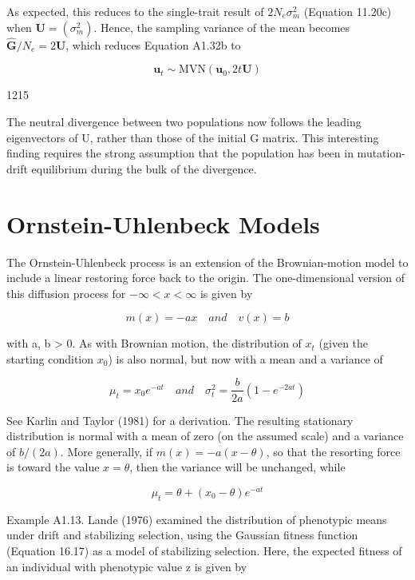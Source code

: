 \documentclass{article}
\begin{document}
As expected, this reduces to the single-trait result of  $ 2N_e\sigma_m^2 $ (Equation 11.20c) when  $ \mathbf{U} = (\sigma_m^2) $. Hence, the sampling variance of the mean becomes  $ \widehat{\mathbf{G}}/N_e = 2\mathbf{U} $, which reduces Equation A1.32b to

\begin{equation}
\mathbf{u}_{t}\sim\mathrm{M V N}(\mathbf{u}_{0},2t\mathbf{U})
\end{equation}

1215

The neutral divergence between two populations now follows the leading eigenvectors of U, rather than those of the initial G matrix. This interesting finding requires the strong assumption that the population has been in mutation-drift equilibrium during the bulk of the divergence.

\section{Ornstein-Uhlenbeck Models}
The Ornstein-Uhlenbeck process is an extension of the Brownian-motion model to include a linear restoring force back to the origin. The one-dimensional version of this diffusion process for  $ -\infty < x < \infty $ is given by

\begin{equation}
m(x)=-ax\quad and\quad v(x)=b
\end{equation}

with a, b > 0. As with Brownian motion, the distribution of  $ x_{t} $ (given the starting condition  $ x_{0} $) is also normal, but now with a mean and a variance of

\begin{equation}
\mu_{t}=x_{0}e^{-at}\quad and\quad\sigma_{t}^{2}=\frac{b}{2a}\left(1-e^{-2at}\right)
\end{equation}

See Karlin and Taylor (1981) for a derivation. The resulting stationary distribution is normal with a mean of zero (on the assumed scale) and a variance of  $ b/(2a) $. More generally, if  $ m(x) = -a(x - \theta) $, so that the resorting force is toward the value  $ x = \theta $, then the variance will be unchanged, while

\begin{equation}
\mu_{t}=\theta+(x_{0}-\theta)e^{-at}
\end{equation}

Example A1.13. Lande (1976) examined the distribution of phenotypic means under drift and stabilizing selection, using the Gaussian fitness function (Equation 16.17) as a model of stabilizing selection. Here, the expected fitness of an individual with phenotypic value z is given by
\end{document}
